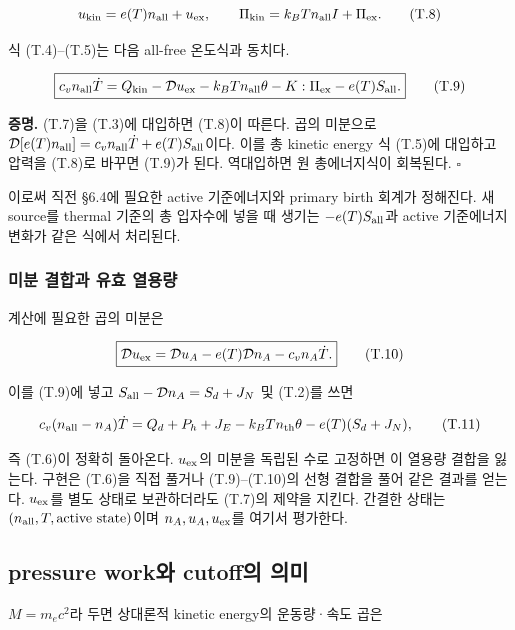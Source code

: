 \[
u_{\rm kin}=e(T)n_{\rm all}+u_{\rm ex},\qquad
\Pi_{\rm kin}=k_BTn_{\rm all}I+\Pi_{\rm ex}.
\tag{T.8}
\]

식 (T.4)--(T.5)는 다음 all-free 온도식과 동치다.

\[
\boxed{
c_vn_{\rm all}\dot T
=Q_{\rm kin}-\mathcal D u_{\rm ex}
-k_BTn_{\rm all}\theta-K:\Pi_{\rm ex}-e(T)S_{\rm all}.
}
\tag{T.9}
\]

\textbf{증명.} (T.7)을 (T.3)에 대입하면 (T.8)이 따른다. 곱의 미분으로 \(\mathcal D[e(T)n_{\rm all}] =c_vn_{\rm all}\dot T+e(T)S_{\rm all}\)이다. 이를 총 kinetic energy 식 (T.5)에 대입하고 압력을 (T.8)로 바꾸면 (T.9)가 된다. 역대입하면 원 총에너지식이 회복된다. \(\square\)

이로써 직전 §6.4에 필요한 active 기준에너지와 primary birth 회계가 정해진다. 새 source를 thermal 기준의 총 입자수에 넣을 때 생기는 \(-e(T)S_{\rm all}\)과 active 기준에너지 변화가 같은 식에서 처리된다.

\hypertarget{uxbbf8uxbd84-uxacb0uxd569uxacfc-uxc720uxd6a8-uxc5f4uxc6a9uxb7c9}{%
\subsubsection{미분 결합과 유효 열용량}\label{uxbbf8uxbd84-uxacb0uxd569uxacfc-uxc720uxd6a8-uxc5f4uxc6a9uxb7c9}}

계산에 필요한 곱의 미분은

\[
\boxed{\mathcal D u_{\rm ex}
=\mathcal D u_A-e(T)\mathcal D n_A-c_vn_A\dot T.}
\tag{T.10}
\]

이를 (T.9)에 넣고 \(S_{\rm all}-\mathcal Dn_A=S_d+J_N\) 및 (T.2)를 쓰면

\[
c_v(n_{\rm all}-n_A)\dot T
=Q_d+P_h+J_E-k_BTn_{\rm th}\theta-e(T)(S_d+J_N),
\tag{T.11}
\]

즉 (T.6)이 정확히 돌아온다. \(u_{\rm ex}\)의 미분을 독립된 수로 고정하면 이 열용량 결합을 잃는다. 구현은 (T.6)을 직접 풀거나 (T.9)--(T.10)의 선형 결합을 풀어 같은 결과를 얻는다. \(u_{\rm ex}\)를 별도 상태로 보관하더라도 (T.7)의 제약을 지킨다. 간결한 상태는 \((n_{\rm all},T,\text{active state})\)이며 \(n_A,u_A,u_{\rm ex}\)를 여기서 평가한다.

\hypertarget{pressure-workuxc640-cutoffuxc758-uxc758uxbbf8}{%
\subsection{pressure work와 cutoff의 의미}\label{pressure-workuxc640-cutoffuxc758-uxc758uxbbf8}}

\(M=m_ec^2\)라 두면 상대론적 kinetic energy의 운동량·속도 곱은

